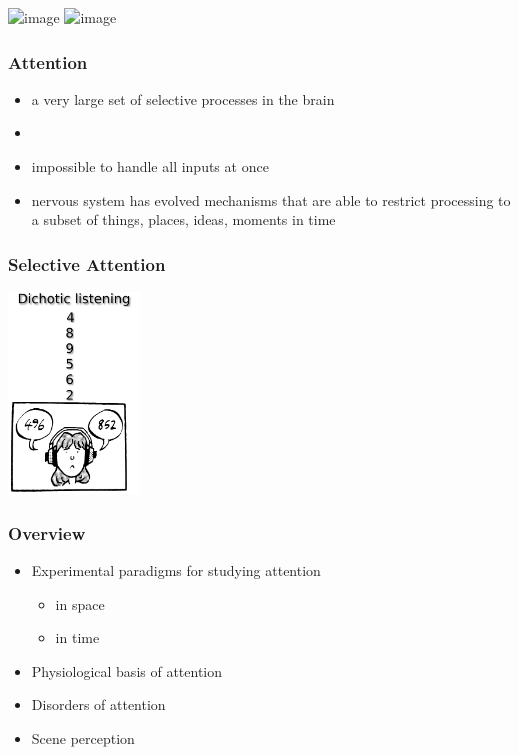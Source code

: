 \documentclass[]{beamer}
\begin{document}
\begin{frame}
 \begin{center}
\includegraphics<1>[width=50mm]{figs/l8/serial_reading.png}
\includegraphics<2->[width=115mm]{figs/l8/waldo.png}
 \end{center} 
\end{frame}


\begin{frame}
 \frametitle{Attention}
\begin{overlayarea}{110mm}{80mm}
 \begin{itemize}
  \item a very large set of selective processes in the brain
 \item[] 
 \item<2-> impossible to handle all inputs at once
 \item<2-> nervous system has evolved mechanisms that are able to restrict processing to a subset of things, places, ideas, moments in time
 \end{itemize}
 \begin{center}
 \end{center} 
\end{overlayarea}
 \end{frame}

\begin{frame}
\frametitle{Selective Attention}
 \begin{center}
\includegraphics[width=35mm]{figs/l1/dichotic_listening_task.png}
 \end{center} 
\end{frame}


\begin{frame}
 \frametitle{Overview}
\begin{itemize}[<+->]
  \setlength{\itemsep}{5pt}
 \item Experimental paradigms for studying attention
 \begin{itemize}
  \item in space
  \item in time
 \end{itemize}
 \item Physiological basis of attention
 \item Disorders of attention
 \item Scene perception
\end{itemize}
\end{frame}
\end{document}
